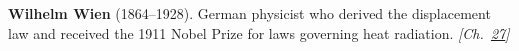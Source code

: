 \nobelphysics \textbf{Wilhelm Wien} (1864–1928). German physicist who derived the displacement law and received the 1911 Nobel Prize for laws governing heat radiation. \emph{[Ch.~\hyperref[ch:planetaryskycolors]{27}]}

